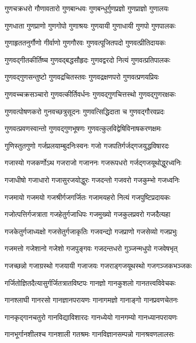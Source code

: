 \twolineshloka
{गुणचक्रधरो गौणावतारो गुणबान्धवः}%
{गुणबन्धुर्गुणप्रज्ञो गुणप्राज्ञो गुणालयः}%

\twolineshloka
{गुणधाता गुणप्राणो गुणगोपो गुणाश्रयः}%
{गुणयायी गुणाधायी गुणपो गुणपालकः}%

\twolineshloka
{गुणाहृततनुर्गौणो गीर्वाणो गुणगौरवः}%
{गुणवत्पूजितपदो गुणवत्प्रीतिदायकः}%

\twolineshloka
{गुणवद्गीतकीर्तिष्च गुणवद्बद्धसौहृदः}%
{गुणवद्वरदो नित्यं गुणवत्प्रतिपालकः}%

\twolineshloka
{गुणवद्गुणसन्तुष्टो गुणवद्रचितस्तवः}%
{गुणवद्रक्षणपरो गुणवत्प्रणयप्रियः}%

\twolineshloka
{गुणवच्चक्रसञ्चारो गुणवत्कीर्तिवर्धनः}%
{गुणवद्गुणचित्तस्थो गुणवद्गुणरक्षकः}%

\twolineshloka
{गुणवत्पोषणकरो गुनवच्छत्रुसूदनः}%
{गुणवत्सिद्धिदाता च गुणवद्गौरवप्रदः}%

\twolineshloka
{गुणवत्प्रवणस्वान्तो गुणवद्गुणभूषणः}%
{गुणवत्कुलविद्वेषिविनाषकरणक्षमः}%

\twolineshloka
{गुणिस्तुतगुणो गर्जप्रलयाम्बुदनिःस्वनः}%
{गजो गजपतिर्गर्जद्गजयुद्धविषारदः}%

\twolineshloka
{गजास्यो गजकर्णोऽथ गजराजो गजाननः}%
{गजरूपधरो गर्जद्गजयूथोद्धुरध्वनिः}%

\twolineshloka
{गजाधीषो गजाधारो गजासुरजयोद्धुरः}%
{गजदन्तो गजवरो गजकुम्भो गजध्वनिः}%

\twolineshloka
{गजमायो गजमयो गजश्रीर्गजगर्जितः}%
{गजामयहरो नित्यं गजपुष्टिप्रदायकः}%

\twolineshloka
{गजोत्पत्तिर्गजत्राता गजहेतुर्गजाधिपः}%
{गजमुख्यो गजकुलप्रवरो गजदैत्यहा}%

\twolineshloka
{गजकेतुर्गजाध्यक्षो गजसेतुर्गजाकृतिः}%
{गजवन्द्यो गजप्राणो गजसेव्यो गजप्रभुः}%

\twolineshloka
{गजमत्तो गजेशानो गजेशो गजपुङ्गवः}%
{गजदन्तधरो गुञ्जन्मधुपो गजवेषभृत्}%

\twolineshloka
{गजच्छन्नो गजाग्रस्थो गजयायी गजाजयः}%
{गजराड्गजयूथस्थो गजगञ्जकभञ्जकः}%

\twolineshloka
{गर्जितोज्ञितदैत्यासुर्गर्जितत्रातविष्टपः}%
{गानज्ञो गानकुशलो गानतत्त्वविवेचकः}%

\twolineshloka
{गानश्लाघी गानरसो गानज्ञानपरायणः}%
{गानागमज्ञो गानाङ्गो गानप्रवणचेतनः}%

\twolineshloka
{गानकृद्गानचतुरो गानविद्याविशारदः}%
{गानध्येयो गानगम्यो गानध्यानपरायणः}%

\twolineshloka
{गानभूर्गानशीलश्च गानशाली गतश्रमः}%
{गानविज्ञानसम्पन्नो गानश्रवणलालसः}%

